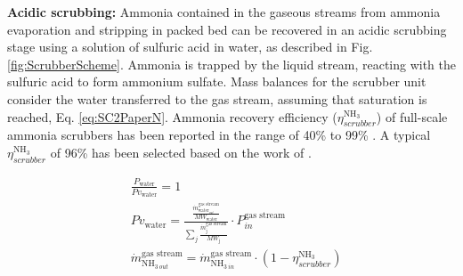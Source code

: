 \begin{refsection}[referencesCh6]

\textbf{Acidic scrubbing:} Ammonia contained in the gaseous streams from
ammonia evaporation
and stripping in packed bed
can be recovered in an acidic scrubbing stage using a solution of sulfuric acid in water, as described in Fig. \ref{fig:ScrubberScheme}. Ammonia is trapped by the liquid stream, reacting with the sulfuric acid to form ammonium sulfate.
Mass balances for the scrubber unit consider the water transferred to the gas stream, assuming that saturation is reached, Eq. \ref{eq:SC2PaperN}. Ammonia  recovery efficiency ($\eta_{scrubber}^{\text{NH}_3}$) of full-scale ammonia scrubbers has been reported in the range of 40\% to 99\% \citep{melse2005}. A typical $\eta_{scrubber}^{\text{NH}_3}$ of 96\% has been selected based on the work of \citet{melse2005}.


\begin{align}
& \frac{P_{\text{water}}}{Pv_{\text{water}}} = 1 \label{eq:SC1PaperN} 
\\
& Pv_{\text{water}} = \frac{\frac{\dot{m}_{\text{water}_{out}}^{\text{gas stream}}}{MW_\text{water}}}
{\sum_{j}\frac{\dot{m}_{\text{j}}^{\text{gas stream}}}{MW_\text{j}}}
\cdot P_{in}^{\text{gas stream}} \label{eq:SC2PaperN} 
\\
& \dot{m}_{\text{NH}_{3 \ out}}^{\text{gas stream}} = \dot{m}_{\text{NH}_{3 \ in}}^{\text{gas stream}} \cdot \left(1-\eta_{scrubber}^{\text{NH}_3}\right) \label{eq:SC3PaperN}
\end{align}


\end{refsection}
